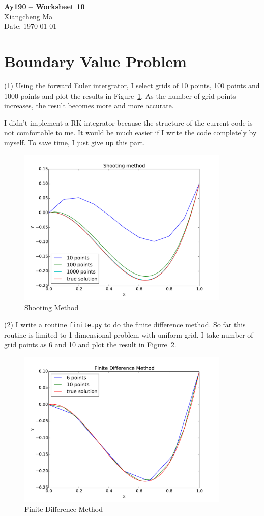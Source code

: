 \documentclass[11pt,letterpaper]{article}
\begin{document}
\begin{center}
\Large
{\bf Ay190 -- Worksheet 10} \\
\large
Xiangcheng Ma \\
Date: \today
\end{center}

\section*{Boundary Value Problem}
(1) Using the forward Euler intergrator, I select grids of 10 points, 100 points and 1000 points and plot the results in Figure~\ref{fig1}. As the number of grid points increases, the result becomes more and more accurate.

I didn't implement a RK integrator because the structure of the current code is not comfortable to me. It would be much easier if I write the code completely by myself. To save time, I just give up this part.

\begin{figure}[th]
\centering
\includegraphics[width=0.9\textwidth]{fig1.pdf}
\caption{Shooting Method}
\label{fig1}
\end{figure}

(2) I write a routine {\tt finite.py} to do the finite difference method. So far this routine is limited to 1-dimensional problem with uniform grid. I take number of grid points as 6 and 10 and plot the result in Figure~\ref{fig2}.

\begin{figure}[th]
\centering
\includegraphics[width=0.9\textwidth]{fig2.pdf}
\caption{Finite Difference Method}
\label{fig2}
\end{figure}
\end{document}
